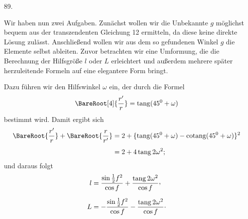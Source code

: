 \par{}\medskip
\hypertarget{native-120-article089}{}
\begin{center}89.\end{center}
Wir haben nun zwei Aufgaben. Zunächst wollen wir die Unbekannte $g$ möglichst bequem aus der transzendenten Gleichung 12 ermitteln, da diese keine direkte Lösung zulässt. Anschließend wollen wir aus dem so gefundenen Winkel $g$ die Elemente selbst ableiten. Zuvor betrachten wir eine Umformung, die die Berechnung der Hilfsgröße $l$ oder $L$ erleichtert und außerdem mehrere später herzuleitende Formeln auf eine elegantere Form bringt.

Dazu führen wir den Hilfswinkel $\omega$ ein, der durch die Formel
\[
\BareRoot[4]{\dfrac{r'}{r}}=\operatorname{tang}(45^0+\omega)
\]
bestimmt wird. Damit ergibt sich
\[
\begin{aligned}
\BareRoot{\dfrac{r'}{r}}+\BareRoot{\dfrac{r}{r'}}
&=2+\{\operatorname{tang}(45^0+\omega)-\operatorname{cotang}(45^0+\omega)\}^2\\[4pt]
&=2+4\operatorname{tang}2\omega^2;
\end{aligned}
\]
und daraus folgt
\[
\begin{aligned}
l&=\frac{\sin\tfrac12f^2}{\cos f}+\frac{\operatorname{tang}2\omega^2}{\cos f}\mathpunct{\raisebox{.45ex}{,}}\\[6pt]
L&=-\frac{\sin\tfrac12f^2}{\cos f}-\frac{\operatorname{tang}2\omega^2}{\cos f}\mathpunct{\cdot}
\end{aligned}
\]
